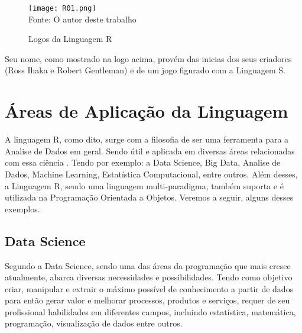    \begin{figure}[H]
     \begin{center}
        \caption{Logos da Linguagem R} \label{ling1}
        \texttt{[image: R01.png]} \\
        {\tiny \sf Fonte: O autor deste trabalho }
     \end{center}
    \end{figure}
Seu nome, como mostrado na logo acima, provém das inicias dos seus criadores (Ross Ihaka e Robert Gentleman) e de um jogo figurado com a Linguagem S.


   \section{\'{A}reas de Aplica\c{c}\~{a}o da Linguagem}
   A linguagem R, como dito, surge com a filosofia de ser uma ferramenta para a Analise de Dados em geral. Sendo útil e aplicada em diversas áreas relacionadas com essa ciência \cite{Wickham2016}. Tendo por exemplo: a Data Science, Big Data, Analise de Dados, Machine Learning, Estatística Computacional, entre outros. Além desses, a Linguagem R, sendo uma linguagem multi-paradigma, também suporta e é utilizada na Programação Orientada a Objetos. Veremos a seguir, alguns desses exemplos. 

        \subsection{ Data Science}
        Segundo \cite{SpiegelHalter2021} a Data Science, sendo uma das áreas da programação que mais cresce atualmente, abarca diversas necessidades e possibilidades. Tendo como objetivo criar, manipular e extrair o máximo possível de conhecimento a partir de dados para então gerar valor e melhorar processos, produtos e serviços, requer de seu profissional habilidades em diferentes campos, incluindo estatística, matemática, programação, visualização de dados entre outros.
        
